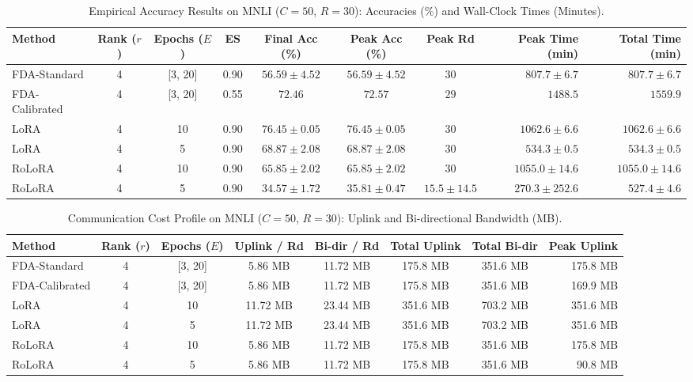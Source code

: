 \documentclass[10pt,a4paper]{article}
\begin{document}
\begin{table}[H]
\centering
\caption{Empirical Accuracy Results on MNLI ($C=50$, $R=30$): Accuracies (\%) and Wall-Clock Times (Minutes).}
\scriptsize
\setlength{\tabcolsep}{3.5pt}
\begin{tabular*}{\textwidth}{@{\extracolsep{\fill}}lccccccrr@{}}
\toprule
\textbf{Method} & \textbf{Rank ($r$)} & \textbf{Epochs ($E$)} & \textbf{ES} & \textbf{Final Acc (\%)} & \textbf{Peak Acc (\%)} & \textbf{Peak Rd} & \textbf{Peak Time (min)} & \textbf{Total Time (min)} \\
\midrule
FDA-Standard & 4 & [3, 20] & 0.90 & $56.59 \pm 4.52$ & $56.59 \pm 4.52$ & $30$ & $807.7 \pm 6.7$ & $807.7 \pm 6.7$ \\
FDA-Calibrated & 4 & [3, 20] & 0.55 & $72.46$ & $\mathbf{72.57}$ & $29$ & $1488.5$ & $1559.9$ \\
LoRA & 4 & 10 & 0.90 & $\mathbf{76.45 \pm 0.05}$ & $\mathbf{76.45 \pm 0.05}$ & $30$ & $1062.6 \pm 6.6$ & $1062.6 \pm 6.6$ \\
LoRA & 4 & 5 & 0.90 & $68.87 \pm 2.08$ & $68.87 \pm 2.08$ & $30$ & $534.3 \pm 0.5$ & $534.3 \pm 0.5$ \\
RoLoRA & 4 & 10 & 0.90 & $65.85 \pm 2.02$ & $65.85 \pm 2.02$ & $30$ & $1055.0 \pm 14.6$ & $1055.0 \pm 14.6$ \\
RoLoRA & 4 & 5 & 0.90 & $34.57 \pm 1.72$ & $35.81 \pm 0.47$ & $15.5 \pm 14.5$ & $\mathbf{270.3 \pm 252.6}$ & $527.4 \pm 4.6$ \\
\bottomrule
\end{tabular*}
\end{table}

\begin{table}[H]
\centering
\caption{Communication Cost Profile on MNLI ($C=50$, $R=30$): Uplink and Bi-directional Bandwidth (MB).}
\scriptsize
\setlength{\tabcolsep}{4.0pt}
\begin{tabular*}{\textwidth}{@{\extracolsep{\fill}}lccccccr@{}}
\toprule
\textbf{Method} & \textbf{Rank ($r$)} & \textbf{Epochs ($E$)} & \textbf{Uplink / Rd} & \textbf{Bi-dir / Rd} & \textbf{Total Uplink} & \textbf{Total Bi-dir} & \textbf{Peak Uplink} \\
\midrule
FDA-Standard & 4 & [3, 20] & 5.86 MB & 11.72 MB & 175.8 MB & 351.6 MB & 175.8 MB \\
FDA-Calibrated & 4 & [3, 20] & 5.86 MB & 11.72 MB & 175.8 MB & 351.6 MB & 169.9 MB \\
LoRA & 4 & 10 & 11.72 MB & 23.44 MB & 351.6 MB & 703.2 MB & 351.6 MB \\
LoRA & 4 & 5 & 11.72 MB & 23.44 MB & 351.6 MB & 703.2 MB & 351.6 MB \\
RoLoRA & 4 & 10 & 5.86 MB & 11.72 MB & 175.8 MB & 351.6 MB & 175.8 MB \\
RoLoRA & 4 & 5 & 5.86 MB & 11.72 MB & 175.8 MB & 351.6 MB & 90.8 MB \\
\bottomrule
\end{tabular*}
\end{table}
\end{document}
